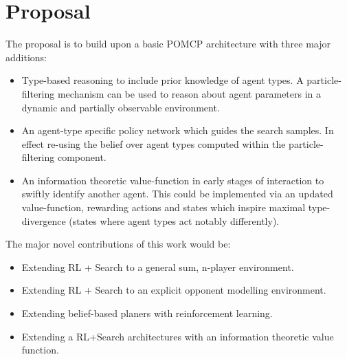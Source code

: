 \section{Proposal}
The proposal is to build upon a basic POMCP architecture with three major additions: 
\begin{itemize}
    \item Type-based reasoning to include prior knowledge of agent types. A particle-filtering mechanism can be used to reason about agent parameters in a dynamic and partially observable environment.
    \item An agent-type specific policy network which guides the search samples. In effect re-using the belief over agent types computed within the particle-filtering component. 
    \item An information theoretic value-function in early stages of interaction to swiftly identify another agent. This could be implemented via an updated value-function, rewarding actions and states which inspire maximal type-divergence (states where agent types act notably differently).
\end{itemize} 
The major novel contributions of this work would be:
\begin{itemize}
    \item Extending RL + Search to a general sum, n-player environment. 
    \item Extending RL + Search to an explicit opponent modelling environment.
    \item Extending belief-based planers with reinforcement learning. 
    \item Extending a RL+Search architectures with an information theoretic value function.  
\end{itemize}
